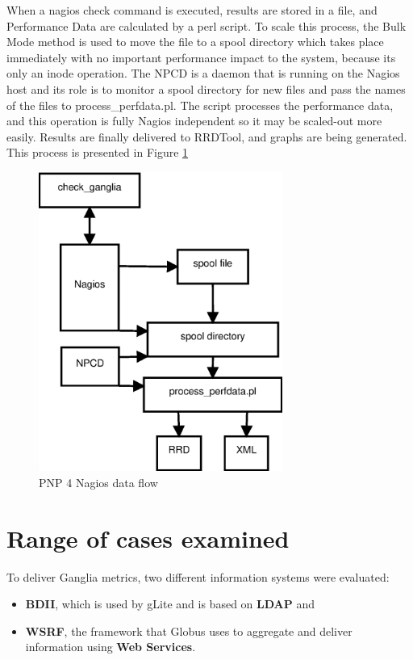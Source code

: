 When a nagios check command is executed, results are stored in a file, and Performance Data are calculated by a perl script. To scale this process, the Bulk Mode method is used to move the file to a spool directory which takes place immediately with no important performance impact to the system, because its only an inode operation. The \ac{NPCD} is a daemon that is running on the Nagios host and its role is to monitor a spool directory for new files and pass the names of the files to process\_perfdata.pl. The script processes the performance data, and this operation is fully Nagios independent so it may be scaled-out more easily. Results are finally delivered to RRDTool, and graphs are being generated. This process is presented in Figure \ref{figure:pnp4nagios}

\begin{figure}[htb]
\centering
 \includegraphics[width=80mm]{images/npcd_pnp4nagios.eps}
\caption{PNP 4 Nagios data flow}
\label{figure:pnp4nagios}
\end{figure}

\section{Range of cases examined}

To deliver Ganglia metrics, two different information systems were evaluated:
\begin{itemize}
  \item {\bf BDII}, which is used by gLite and is based on {\bf LDAP} and
  \item {\bf WSRF}, the framework that Globus uses to aggregate and deliver information using {\bf Web Services}.
\end{itemize}

